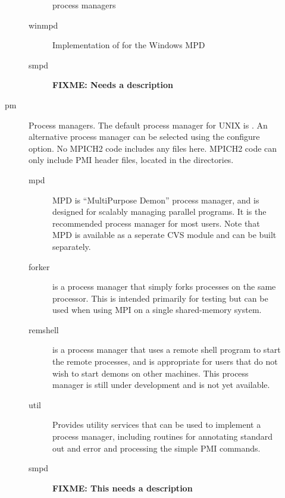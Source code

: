 \documentclass{article}
\def\fixme#1{\marginpar{FIXME:}\textbf{FIXME: #1}}
\begin{document}
\begin{description}
\begin{description}
\begin{description}
             process managers
          \item[winmpd]Implementation of  for the Windows
          MPD
          \item[smpd]\fixme{Needs a description}
    \end{description}
    \item[pm]Process managers.  The default process manager for UNIX is
      .  An alternative process manager can be selected using the
       configure option.  No MPICH2 code includes
      any files here.  MPICH2 code can only include PMI header files,
      located in the  directories.
        \begin{description}
        \item[mpd]MPD is ``MultiPurpose Demon'' process manager, and
        is designed for scalably managing parallel programs.  It is
        the recommended process manager for most users.
        Note that MPD is available as a seperate CVS module and can be
        built separately.
        \item[forker]is a process manager that simply forks processes
        on the same processor.  This is intended primarily for testing
        but can be used when using MPI on a single shared-memory system.
        \item[remshell]is a process manager that uses a remote shell
        program to start the remote processes, and is appropriate for
        users that do not wish to start demons on other machines.
        This process manager is still under development and is not
        yet available.
        \item[util]Provides utility services that can be used to
        implement a process manager, including routines for annotating
        standard out and error and processing the simple PMI commands.
        \item[smpd]\fixme{This needs a description}
        \end{description}


\end{description}
\end{description}
\end{document}

